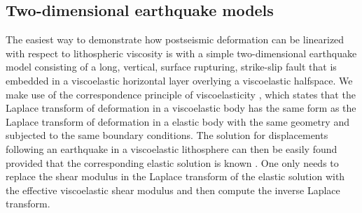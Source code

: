 \documentclass[extra]{gji}
\begin{document}
\subsection{Two-dimensional earthquake models}
The easiest way to demonstrate how postseismic deformation can be
linearized with respect to lithospheric viscosity is with a simple
two-dimensional earthquake model consisting of a long, vertical,
surface rupturing, strike-slip fault that is embedded in a
viscoelastic horizontal layer overlying a viscoelastic halfspace.  We
make use of the correspondence principle of viscoelasticity
\citep[e.g.][]{F1975}, which states that the Laplace transform of
deformation in a viscoelastic body has the same form as the Laplace
transform of deformation in a elastic body with the same geometry and
subjected to the same boundary conditions. The solution for
displacements following an earthquake in a viscoelastic lithosphere
can then be easily found provided that the corresponding elastic
solution is known \citep[e.g.][]{NM1974,SP1978,HH2005}.  One only
needs to replace the shear modulus in the Laplace transform of the
elastic solution with the effective viscoelastic shear modulus and
then compute the inverse Laplace transform.
\end{document}
